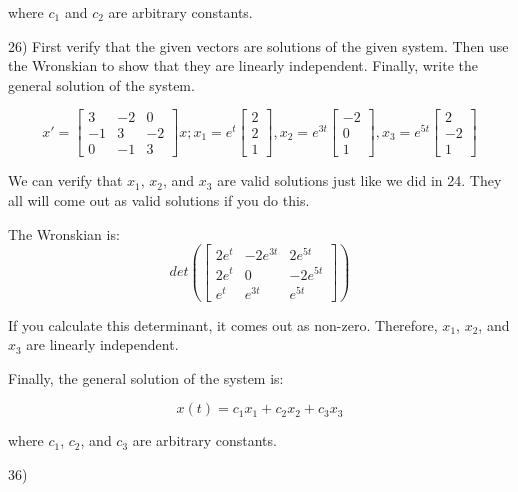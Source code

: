 \documentclass{article}
\begin{document}
where $c_1$ and $c_2$ are arbitrary constants.


26) First verify that the given vectors are solutions of the given system. Then use the Wronskian to show that they are linearly independent. Finally, write the general solution of the system.

\[x' = \begin{bmatrix}
    3 & -2 & 0 \\
    -1 & 3 & -2 \\
    0 & -1 & 3
\end{bmatrix} x; x_1 = e^t \begin{bmatrix}
    2 \\
    2 \\
    1
\end{bmatrix}, x_2 = e^{3t} \begin{bmatrix}
    -2 \\
    0 \\
    1
\end{bmatrix}, x_3 = e^{5t} \begin{bmatrix}
    2 \\
    -2 \\
    1
\end{bmatrix}\]

We can verify that $x_1$, $x_2$, and $x_3$ are valid solutions just like we did in 24.
They all will come out as valid solutions if you do this.

The Wronskian is:
\[det \left( \begin{bmatrix}
    2e^t & -2e^{3t} & 2e^{5t} \\
    2e^t & 0 & -2e^{5t} \\
    e^t & e^{3t} & e^{5t}
\end{bmatrix} \right)\]

If you calculate this determinant, it comes out as non-zero.
Therefore, $x_1$, $x_2$, and $x_3$ are linearly independent.

Finally, the general solution of the system is:

\[x(t) = c_1 x_1 + c_2 x_2 + c_3 x_3\]

where $c_1$, $c_2$, and $c_3$ are arbitrary constants.


36)
\end{document}
